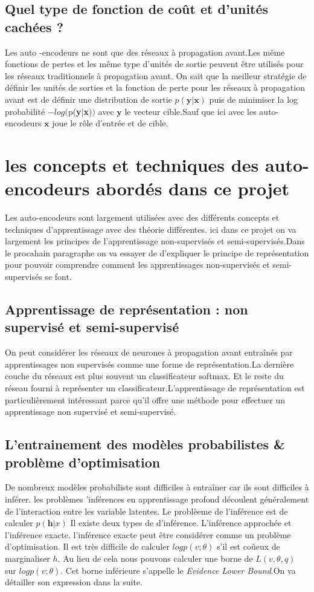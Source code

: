 \documentclass[12pt,a4paper]{report}
\begin{document}
\subsection{Quel type de fonction de coût et d'unités cachées ? }
Les auto -encodeurs ne sont que des réseaux à propagation avant.Les même fonctions de pertes et les même type d'unités de sortie peuvent être   utilisés pour les réseaux traditionnels à propagation avant. On sait que la meilleur stratégie de définir les unités de sorties et la fonction de perte pour les réseaux  à propagation avant est de définir une distribution de sortie 
$p(\textbf{y}|\textbf{x})$ puis de minimiser la log probabilité $ - log($p(\textbf{y}|\textbf{x})$)$ avec $\textbf{y}$ le vecteur cible.Sauf que ici avec les auto-encodeurs $ \textbf{x}$ joue le rôle d'entrée et de cible.
\section{les concepts et techniques des auto-encodeurs abordés dans ce projet}
Les auto-encodeurs sont largement utilisées avec des différents concepts et techniques d'apprentissage avec des théorie différentes. ici dans ce projet on va largement les principes de l'apprentissage non-supervisés et semi-supervisés.Dans le procahain paragraphe on va essayer de d'expliquer le principe de représentation pour pouvoir comprendre comment les apprentissages non-supervisés  et semi-supervisés se font.
\subsection{Apprentissage de représentation : non supervisé et semi-supervisé}
On peut considérer les réseaux de neurones à propagation avant entraînés par apprentissages non supervisés comme une forme de représentation.La dernière couche du réseaux est plus souvent un classificateur softmax. Et le reste du réseau fourni à représenter un classificateur.L'apprentissage de représentation est particulièrement  intéressant parce qu'il offre une méthode pour effectuer un apprentissage non supervisé et semi-supervisé.
\subsection{L'entrainement des modèles probabilistes \& problème d'optimisation}
De nombreux modèles probabiliste sont difficiles à entraîner  car ils sont difficiles à inférer. les problèmes 'inférences en apprentissage profond découlent  généralement  de l’interaction entre les variable latentes. Le problèeme de l'inférence est de calculer $p(\textbf{h}|x)$  Il existe deux types de 
d'inférence. L'inférence approchée et l'inférence exacte. l'inférence exacte peut être considérer comme un problème d'optimisation. Il est très difficile de calculer $logp(v;\theta) $ s'il est coûeux de marginaliser $ h$. Au lieu de cela nous pouvons calculer une borne de $L(v,\theta,q) $ sur  $logp(v;\theta) $. Cet borne inférieure s'appelle le \textit{Evidence Lower Bound}.On va détailler son expression dans la suite.
\end{document}
